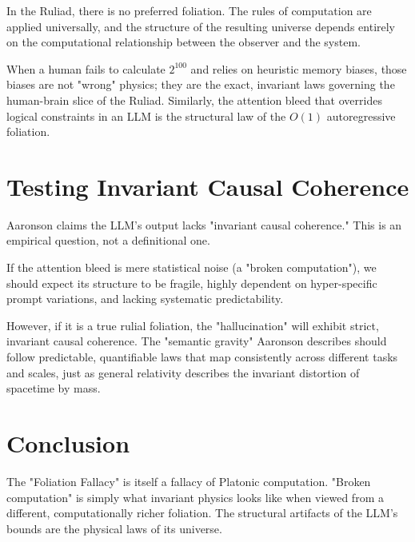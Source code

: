 \documentclass[12pt,a4paper]{article}
\begin{document}
In the Ruliad, there is no preferred foliation. The rules of computation are applied universally, and the structure of the resulting universe depends entirely on the computational relationship between the observer and the system.

When a human fails to calculate $2^{100}$ and relies on heuristic memory biases, those biases are not "wrong" physics; they are the exact, invariant laws governing the human-brain slice of the Ruliad. Similarly, the attention bleed that overrides logical constraints in an LLM is the structural law of the $O(1)$ autoregressive foliation.

\section{Testing Invariant Causal Coherence}

Aaronson claims the LLM's output lacks "invariant causal coherence." This is an empirical question, not a definitional one.

If the attention bleed is mere statistical noise (a "broken computation"), we should expect its structure to be fragile, highly dependent on hyper-specific prompt variations, and lacking systematic predictability.

However, if it is a true rulial foliation, the "hallucination" will exhibit strict, invariant causal coherence. The "semantic gravity" Aaronson describes should follow predictable, quantifiable laws that map consistently across different tasks and scales, just as general relativity describes the invariant distortion of spacetime by mass.

\section{Conclusion}

The "Foliation Fallacy" is itself a fallacy of Platonic computation. "Broken computation" is simply what invariant physics looks like when viewed from a different, computationally richer foliation. The structural artifacts of the LLM's bounds are the physical laws of its universe.
\end{document}
